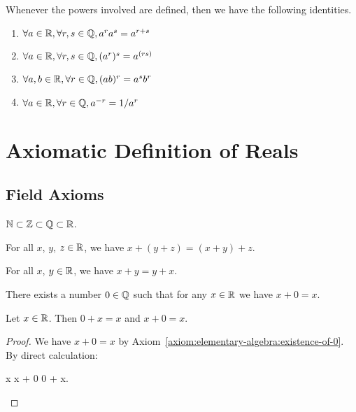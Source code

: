  Whenever the powers involved are defined, then we
have the following identities.
\begin{enumerate}[resume*]
\item $\forall a\in\mathbb{R},\forall r,s\in\mathbb{Q},a^{r}a^{s}=a^{r+s}$
\item $\forall a\in\mathbb{R},\forall r,s\in\mathbb{Q},(a^{r})^{s}=a^{(rs)}$
\item $\forall a,b\in\mathbb{R},\forall r\in\mathbb{Q},(ab)^{r}=a^{s}b^{r}$
\item $\forall a\in\mathbb{R},\forall r\in\mathbb{Q}, a^{-r} = 1/a^{r}$
\end{enumerate}

\section{Axiomatic Definition of Reals}

\subsection{Field Axioms}

\begin{axiom}
$\mathbb{N}\subset\mathbb{Z}\subset\mathbb{Q}\subset\mathbb{R}$.
\end{axiom}

\begin{axiom}\label{axiom:elementary-algebra:add-associativity}
For all $x$, $y$, $z\in\mathbb{R}$, we have $x + (y + z) = (x + y) + z$.
\end{axiom}

\begin{axiom}\label{axiom:elementary-algebra:add-commutativity}
For all $x$, $y\in\mathbb{R}$, we have $x + y = y + x$.
\end{axiom}

\begin{axiom}[Existence of $0$]\label{axiom:elementary-algebra:existence-of-0}
There exists a number $0\in\mathbb{Q}$ such that for any $x\in\mathbb{R}$ we have $x+0=x$.
\end{axiom}

\begin{proposition}\label{prop:elementary-algebra:additive-unit-identity}
Let $x\in\mathbb{R}$. Then $0 + x = x$ and $x + 0 = x$.
\end{proposition}

\begin{proof}
We have $x + 0 = x$ by Axiom~\ref{axiom:elementary-algebra:existence-of-0}.
By direct calculation:
\begin{calculation}
x
x + 0
0 + x.\qedhere
\end{calculation}
\end{proof}

